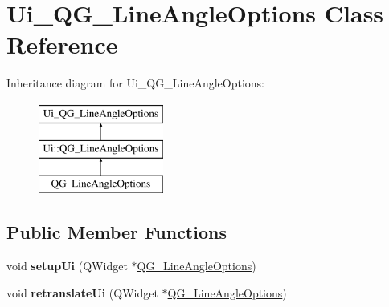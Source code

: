 \hypertarget{classUi__QG__LineAngleOptions}{\section{Ui\-\_\-\-Q\-G\-\_\-\-Line\-Angle\-Options Class Reference}
\label{classUi__QG__LineAngleOptions}
}
Inheritance diagram for Ui\-\_\-\-Q\-G\-\_\-\-Line\-Angle\-Options\-:\begin{figure}[H]
\begin{center}
\leavevmode
\includegraphics[height=3.000000cm]{classUi__QG__LineAngleOptions}
\end{center}
\end{figure}
\subsection*{Public Member Functions}
\begin{DoxyCompactItemize}
\item 
\hypertarget{classUi__QG__LineAngleOptions_a412300743bbca3798d799d9a646eb710}{void {\bfseries setup\-Ui} (Q\-Widget $\ast$\hyperlink{classQG__LineAngleOptions}{Q\-G\-\_\-\-Line\-Angle\-Options})}\label{classUi__QG__LineAngleOptions_a412300743bbca3798d799d9a646eb710}

\item 
\hypertarget{classUi__QG__LineAngleOptions_a67538ac5e41df60e9b2332d45053fca6}{void {\bfseries retranslate\-Ui} (Q\-Widget $\ast$\hyperlink{classQG__LineAngleOptions}{Q\-G\-\_\-\-Line\-Angle\-Options})}\label{classUi__QG__LineAngleOptions_a67538ac5e41df60e9b2332d45053fca6}

\end{DoxyCompactItemize}
